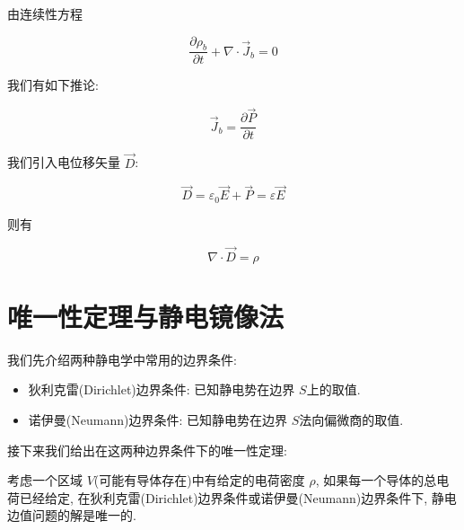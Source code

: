 由连续性方程

$$
\frac{\partial \rho_b}{\partial t}+\nabla \cdot \vec J_b = 0
$$

我们有如下推论: 

\begin{corollary}[束缚电流密度]
    \begin{equation}
        \vec J_b = \frac{\partial \vec P}{\partial t}
    \end{equation}
\end{corollary}

我们引入电位移矢量 $\vec{D}$:

\begin{definition}[电位移矢量]
    \begin{equation}
        \vec{D} = \varepsilon_0 \vec{E}+\vec{P} =  \varepsilon \vec{E}
    \end{equation}
\end{definition}

则有
\begin{corollary}[介质中的泊松方程]
    \begin{equation}
        \nabla \cdot \vec{D} = \rho
    \end{equation}
\end{corollary}

\section{唯一性定理与静电镜像法}

我们先介绍两种静电学中常用的边界条件:

\begin{itemize}
    \item 狄利克雷(Dirichlet)边界条件: 已知静电势在边界 $S$上的取值.
    \item 诺伊曼(Neumann)边界条件: 已知静电势在边界 $S$法向偏微商的取值.
\end{itemize}

接下来我们给出在这两种边界条件下的唯一性定理:

\begin{theorem}[静电唯一性定理] 
    考虑一个区域 $V$(可能有导体存在)中有给定的电荷密度 $\rho$, 如果每一个导体的总电荷已经给定, 在狄利克雷(Dirichlet)边界条件或诺伊曼(Neumann)边界条件下, 静电边值问题的解是唯一的.
\end{theorem}

\begin{figure}
    \centering
    \caption{} \label{fig2}
\end{figure}

